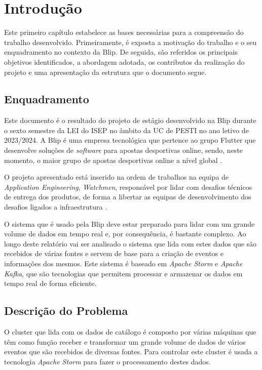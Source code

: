\chapter{Introdução} 	
\label{sec:1-Introducao}

Este primeiro capítulo estabelece as bases necessárias para a compreensão do trabalho desenvolvido. 
Primeiramente, é exposta a motivação do trabalho e o seu enquadramento no contexto da Blip. 
De seguida, são referidos os principais objetivos identificados, a abordagem adotada, os contributos 
da realização do projeto e uma apresentação da estrutura que o documento segue.

\section{Enquadramento}

Este documento é o resultado do projeto de estágio desenvolvido na Blip durante o sexto semestre 
da \ac{LEI} do \ac{ISEP} no âmbito da \ac{UC} de \ac{PESTI} no ano letivo de 2023/2024. A Blip é 
uma empresa tecnológica que pertence ao grupo Flutter que desenvolve soluções de \textit{software} 
para apostas desportivas online, sendo, neste momento, o maior grupo de apostas desportivas online 
a nível global \cite{blip}.

O projeto apresentado está inserido na ordem de trabalhos na equipa de \textit{Application Engineering},
\textit{Watchmen}, responsável por lidar com desafios técnicos de entrega dos produtos, de forma
a libertar as equipas de desenvolvimento dos desafios ligados a infraestrutura \cite{blip-jobs}.

O sistema que é usado pela Blip deve estar preparado para lidar com um grande volume de dados em 
tempo real e, por consequência, é bastante complexo. Ao longo deste relatório vai ser analisado 
o sistema que lida com estes dados que são recebidos de várias fontes e servem de base para a 
criação de eventos e informações dos mesmos. Este sistema é baseado em \textit{Apache Storm} e 
\textit{Apache Kafka}, que são tecnologias que permitem processar e armazenar os dados em tempo 
real de forma eficiente.

\section{Descrição do Problema}

O \gls{cluster} que lida com os dados de catálogo é composto por várias máquinas que têm
como função receber e transformar um grande volume de dados de vários eventos que são recebidos de 
diversas fontes. Para controlar este \gls{cluster} é usada a tecnologia \textit{Apache Storm}
para fazer o processamento destes dados.


